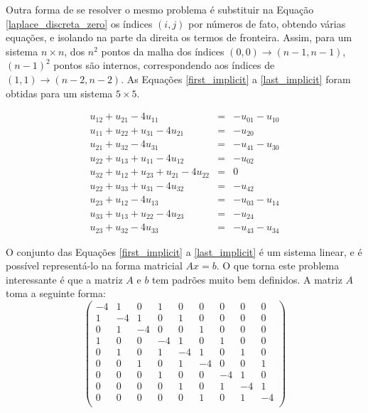 \documentclass[journal]{IEEEtran}
\begin{document}
Outra forma de se resolver o mesmo problema é substituir na Equação \ref{laplace_discreta_zero} os índices $(i,j)$ por números de fato, obtendo várias equações, e isolando na parte da direita os termos de fronteira. Assim, para um sistema $n\times n$, dos $n^2$ pontos da malha dos índices $(0,0)\rightarrow (n-1,n-1)$, $(n-1)^2$ pontos são internos, correspondendo aos índices de $(1,1)\rightarrow (n-2,n-2)$. As Equações \ref{first_implicit} a \ref{last_implicit} foram obtidas para um sistema $5\times 5$.

\begin{eqnarray}
u_{12}+u_{21} -4u_{11}& = & -u_{01}-u_{10} \label{first_implicit} \\
u_{11}+u_{22}+u_{31}-4u_{21}& =& -u_{20} \\
u_{21}+u_{32}-4u_{31}&=&-u_{41}-u_{30} \\
u_{22}+u_{13}+u_{11}-4u_{12}&=&-u_{02} \\
u_{32}+u_{12}+u_{23}+u_{21}-4u_{22}&=&0 \\
u_{22}+u_{33}+u_{31}-4u_{32}&=&-u_{42} \\
u_{23}+u_{12}-4u_{13}&=&-u_{03}-u_{14} \\
u_{33}+u_{13}+u_{22}-4u_{23}&=&-u_{24} \\
u_{23}+u_{32}-4u_{33}&=&-u_{43}-u_{34} \label{last_implicit}
\end{eqnarray}

O conjunto das Equações \ref{first_implicit} a \ref{last_implicit} é um sistema linear, e é possível representá-lo na forma matricial $Ax = b$. O que torna este problema interessante é que a matriz $A$ e $b$ tem padrões muito bem definidos. A matriz $A$ toma a seguinte forma:
\[ \left( \begin{array}{ccccccccc}
-4 & 1 & 0 & 1 & 0 & 0 & 0 & 0 & 0 \\ %
1 & -4 & 1 & 0 & 1 & 0 & 0 & 0 & 0 \\ %
0 & 1 & -4 & 0 & 0 & 1 & 0 & 0 & 0 \\ %
1 & 0 & 0 & -4 & 1 & 0 & 1 & 0 & 0 \\ %
0 & 1 & 0 & 1 & -4 & 1 & 0 & 1 & 0 \\ %
0 & 0 & 1 & 0 & 1 & -4 & 0 & 0 & 1 \\ %
0 & 0 & 0 & 1 & 0 & 0 & -4 & 1 & 0 \\ %
0 & 0 & 0 & 0 & 1 & 0 & 1 & -4 & 1 \\ %
0 & 0 & 0 & 0 & 0 & 1 & 0 & 1 & -4 \\ %
\end{array} \right)\]
\end{document}
